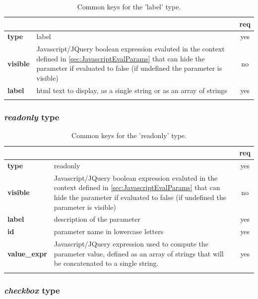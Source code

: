 \begin{longtable}{|>{\bf}L{\linewidth}|L{\linewidth}|c|}
\hline
      &  & {\bf req} 
\tabularnewline \hline \hline
 type  & label       & yes \\ \hline
 visible  & Javascript/JQuery boolean expression evaluted in the context defined 
              in \ref{sec:JavascriptEvalParams} that can hide the parameter if
            evaluated to false (if undefined the parameter is visible)& no \\ \hline
 label & html text to display, as a single string or as an array of strings& yes
                      \\ \hline
\caption{Common keys for the 'label' type.}
\end{longtable}


\subsubsection{ \emph{readonly} type}

\begin{longtable}{|>{\bf}L{\linewidth}|L{\linewidth}|c|}
\hline
      &  & {\bf req} 
\tabularnewline \hline \hline
 type  & readonly    & yes \\ \hline
 visible  & Javascript/JQuery boolean expression evaluted in the context defined 
              in \ref{sec:JavascriptEvalParams} that can hide the parameter if
            evaluated to false (if undefined the parameter is visible)& no \\ \hline
 label & description of the parameter & yes \\ \hline
 id         & parameter name in lowercase letters  & yes \\ \hline
 value\_expr & Javascript/JQuery expression used to compute the parameter value, defined as an
              array of strings that will be concatenated to a single string.
            & yes \\ \hline
\caption{Common keys for the 'readonly' type.}
\end{longtable}

\subsubsection{ \emph{checkbox} type}

